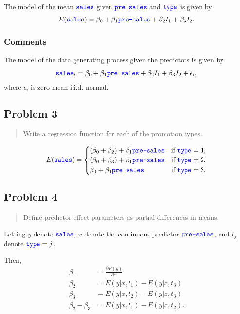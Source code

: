 \documentclass[
]{article}
\begin{document}
The model of the mean \(\textcolor{blue}{\texttt{sales}}\) given \(\textcolor{blue}{\texttt{pre-sales}}\) and
\(\textcolor{blue}{\texttt{type}}\) is given by \[
  E(\textcolor{blue}{\texttt{sales}}) = \beta_0 + \beta_1 \textcolor{blue}{\texttt{pre-sales}} + \beta_2 I_1 + \beta_3 I_2.
\]

\hypertarget{comments}{%
\subsubsection{Comments}\label{comments}}

The model of the data generating process given the predictors is given
by \[
  \textcolor{blue}{\texttt{sales}}_i = \beta_0 + \beta_1 \textcolor{blue}{\texttt{pre-sales}} + \beta_2 I_1 + \beta_3 I_2 + \epsilon_i,
\] where \(\epsilon_i\) is zero mean i.i.d. normal.

\hypertarget{problem-3}{%
\subsection{Problem 3}\label{problem-3}}

\begin{quote}
Write a regression function for each of the promotion types.
\end{quote}

\[
  E(\textcolor{blue}{\texttt{sales}}) = 
  \begin{cases}
    (\beta_0 + \beta_2) + \beta_1 \textcolor{blue}{\texttt{pre-sales}} & \text{if} \;\textcolor{blue}{\texttt{type}} = 1,\\
    (\beta_0 + \beta_3) + \beta_1 \textcolor{blue}{\texttt{pre-sales}} & \text{if} \;\textcolor{blue}{\texttt{type}} = 2,\\
    \beta_0 + \beta_1 \textcolor{blue}{\texttt{pre-sales}}         & \text{if} \;\textcolor{blue}{\texttt{type}} = 3.
  \end{cases}
\]

\hypertarget{problem-4}{%
\subsection{Problem 4}\label{problem-4}}

\begin{quote}
Define predictor effect parameters as partial differences in means.
\end{quote}

Letting \(y\) denote \(\textcolor{blue}{\texttt{sales}}\), \(x\) denote the continuous
predictor \(\textcolor{blue}{\texttt{pre-sales}}\), and \(t_j\) denote \(\textcolor{blue}{\texttt{type}}=j\).

Then, \begin{align*}
  \beta_1 &= \frac{\partial E(y)}{\partial x}\\
  \beta_2 &= E(y|x,t_1) - E(y|x,t_3)\\
  \beta_3 &= E(y|x,t_2) - E(y|x,t_3)\\
  \beta_2-\beta_3 &= E(y|x,t_1) - E(y|x,t_2).
\end{align*}
\end{document}
